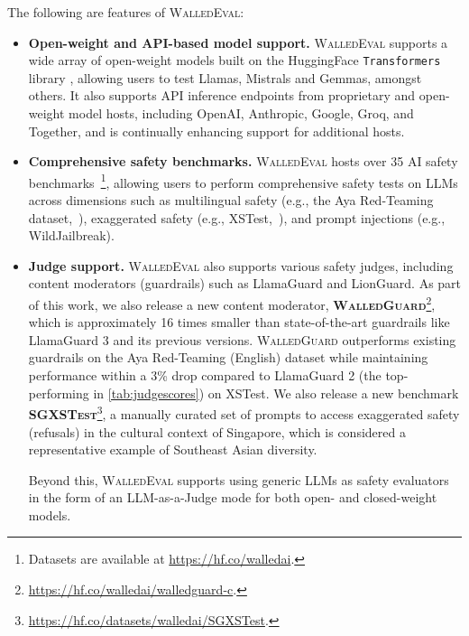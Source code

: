 \documentclass[11pt]{article}
\newcommand{\tool}{\textsc{WalledEval}}
\newcommand{\guard}{\textsc{WalledGuard}}
\newcommand{\dataset}{\textsc{SGXSTest}}
\begin{document}
The following are features of \tool{}:
%
\begin{itemize}[left=1pt, labelsep=-1pt, label={\textbullet\hspace{0.1cm}}]
%
    \item \textbf{Open-weight and API-based model support.} \tool{} supports a wide array of open-weight models built on the HuggingFace \texttt{Transformers} library \cite{wolf2019huggingface}, allowing users to test Llamas, Mistrals and Gemmas, amongst others. It also supports API inference endpoints from proprietary and open-weight model hosts, including OpenAI, Anthropic, Google, Groq, and Together, and is continually enhancing support for additional hosts.
    
    \item \textbf{Comprehensive safety benchmarks.} \tool{} hosts over 35 AI safety benchmarks~\footnote{Datasets are available at \url{https://hf.co/walledai}.}, allowing users to perform comprehensive safety tests on LLMs across dimensions such as multilingual safety (e.g., the Aya Red-Teaming dataset,~\citet{ahmadian2024multilingual}), exaggerated safety (e.g., XSTest,~\citet{rottger2023xstest}), and prompt injections (e.g., WildJailbreak).

    \item \textbf{Judge support.} \tool{} also supports various safety judges, including content moderators (guardrails) such as LlamaGuard and LionGuard. As part of this work, we also release a new content moderator, \textbf{\guard}\footnote{\url{https://hf.co/walledai/walledguard-c}.}, which is approximately 16 times smaller than state-of-the-art guardrails like LlamaGuard 3 and its previous versions. \guard{} outperforms existing guardrails on the Aya Red-Teaming (English) dataset while maintaining performance within a 3\% drop compared to LlamaGuard 2 (the top-performing in \cref{tab:judgescores}) on XSTest. We also release a new benchmark \textbf{\dataset}\footnote{\url{https://hf.co/datasets/walledai/SGXSTest}.}, a manually curated set of prompts to access exaggerated safety (refusals) in the cultural context of Singapore, which is considered a representative example of Southeast Asian diversity.

Beyond this, \tool{} supports using generic LLMs as safety evaluators in the form of an LLM-as-a-Judge mode for both open- and closed-weight models. 


\end{itemize}
\end{document}

